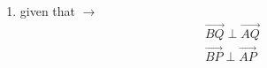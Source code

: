 \begin{enumerate}[label=\thesection.\arabic*.,ref=\thesection.\theenumi]
	
\item 	given that $\to$
\begin{align}
\vec{BQ} \perp \vec{AQ}\\
\vec{BP} \perp \vec{AP}	
\end{align}
\end{enumerate}
